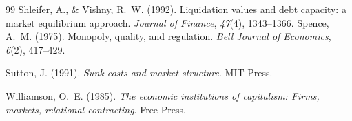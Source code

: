 \documentclass[11pt,a4paper]{article}
\begin{document}
\begin{thebibliography}{99}
Shleifer, A., \& Vishny, R.~W. (1992).
Liquidation values and debt capacity: a market equilibrium approach.
\emph{Journal of Finance}, \emph{47}(4), 1343--1366.
Spence, A.~M. (1975).
Monopoly, quality, and regulation.
\emph{Bell Journal of Economics}, \emph{6}(2), 417--429.

Sutton, J. (1991).
\emph{Sunk costs and market structure}.
MIT Press.

Williamson, O.~E. (1985).
\emph{The economic institutions of capitalism: Firms, markets, relational contracting}.
Free Press.








\end{thebibliography}
\end{document}
